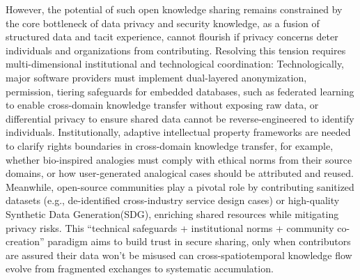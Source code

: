 However, the potential of such open knowledge sharing remains constrained by the core bottleneck of data privacy and security knowledge, as a fusion of structured data and tacit experience, cannot flourish if privacy concerns deter individuals and organizations from contributing\cite{jain2016big}. Resolving this tension requires multi-dimensional institutional and technological coordination\cite{wu2012effect}: Technologically, major software providers must implement dual-layered anonymization, permission, tiering safeguards for embedded databases, such as federated learning to enable cross-domain knowledge transfer without exposing raw data, or differential privacy to ensure shared data cannot be reverse-engineered to identify individuals\cite{jain2016big}. Institutionally, adaptive intellectual property frameworks are needed to clarify rights boundaries in cross-domain knowledge transfer, for example, whether bio-inspired analogies must comply with ethical norms from their source domains, or how user-generated analogical cases should be attributed and reused\cite{wu2012effect, grossman2004international}. Meanwhile, open-source communities play a pivotal role by contributing sanitized datasets (e.g., de-identified cross-industry service design cases)\cite{tamburri2019discovering} or high-quality Synthetic Data Generation(SDG)\cite{bauer2024comprehensive}, enriching shared resources while mitigating privacy risks. This ``technical safeguards + institutional norms + community co-creation'' paradigm aims to build trust in secure sharing, only when contributors are assured their data won’t be misused can cross-spatiotemporal knowledge flow evolve from fragmented exchanges to systematic accumulation.  


